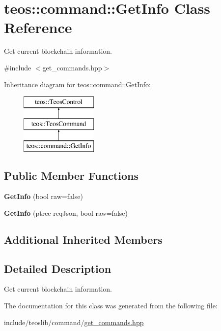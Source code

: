 \hypertarget{classteos_1_1command_1_1_get_info}{}\section{teos\+:\+:command\+:\+:Get\+Info Class Reference}
\label{classteos_1_1command_1_1_get_info}


Get current blockchain information.  




{\ttfamily \#include $<$get\+\_\+commands.\+hpp$>$}

Inheritance diagram for teos\+:\+:command\+:\+:Get\+Info\+:\begin{figure}[H]
\begin{center}
\leavevmode
\includegraphics[height=3.000000cm]{classteos_1_1command_1_1_get_info}
\end{center}
\end{figure}
\subsection*{Public Member Functions}
\begin{DoxyCompactItemize}
\item 
\mbox{\label{classteos_1_1command_1_1_get_info_ac15b485dd53c3b440a09bdb2be5bbc27}} 
{\bfseries Get\+Info} (bool raw=false)
\item 
\mbox{\label{classteos_1_1command_1_1_get_info_ac12a0c7b894af0d486737d299c776244}} 
{\bfseries Get\+Info} (ptree req\+Json, bool raw=false)
\end{DoxyCompactItemize}
\subsection*{Additional Inherited Members}


\subsection{Detailed Description}
Get current blockchain information. 

The documentation for this class was generated from the following file\+:\begin{DoxyCompactItemize}
\item 
include/teoslib/command/\mbox{\hyperlink{get__commands_8hpp}{get\+\_\+commands.\+hpp}}\end{DoxyCompactItemize}
